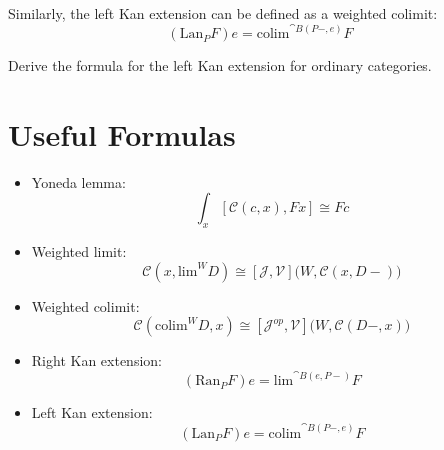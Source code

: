 \documentclass[DaoFP]{subfiles}
\begin{document}
Similarly, the left Kan extension can be defined as a weighted colimit:
\[ (\text{Lan}_P F) e = \text{colim}^{\cat B(P-, e)} F \]

\begin{exercise}
Derive the formula for the left Kan extension for ordinary categories.
\end{exercise}

\section{Useful Formulas}
\begin{itemize}
\item Yoneda lemma:
\[ \int_x [\mathcal C( c, x), F x] \cong F c \]
\item Weighted limit:
\[  \mathcal C(x, \text{lim}^W D) \cong [\mathcal J, \mathcal V] \big(W, \mathcal C(x, D-)\big) \]
\item Weighted colimit:
\[  \mathcal C(\text{colim}^W D, x) \cong [\mathcal J^{op}, \mathcal V] \big(W, \mathcal C(D-, x)\big) \]
\item Right Kan extension:
\[ (\text{Ran}_P F) e = \text{lim}^{\cat B(e, P-)} F  \]
\item Left Kan extension:
\[ (\text{Lan}_P F) e = \text{colim}^{\cat B(P-, e)} F \]
\end{itemize}
\end{document}
